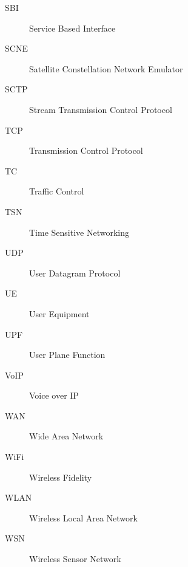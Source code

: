 \begin{description}
\item[SBI] Service Based Interface
\item[SCNE] Satellite Constellation Network Emulator
\item[SCTP] Stream Transmission Control Protocol
\item[TCP] Transmission Control Protocol
\item[TC] Traffic Control
\item[TSN] Time Sensitive Networking
\item[UDP] User Datagram Protocol
\item[UE] User Equipment
\item[UPF] User Plane Function 
\item[VoIP] Voice over IP
\item[WAN] Wide Area Network
\item[WiFi] Wireless Fidelity
\item[WLAN] Wireless Local Area Network
\item[WSN] Wireless Sensor Network


\end{description}